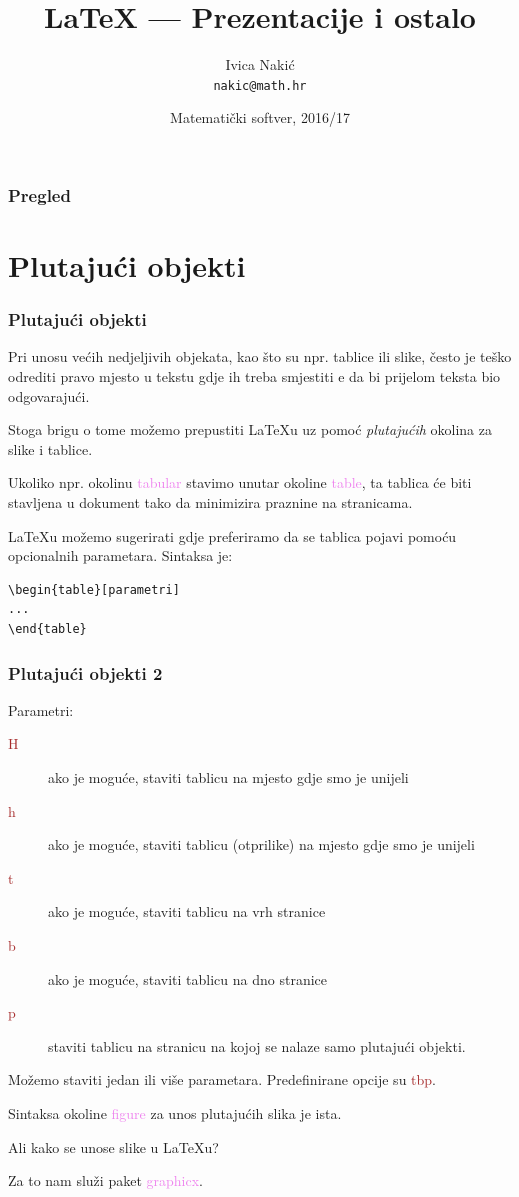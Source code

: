 \documentclass{beamer}
\title{\LaTeX{} --- Prezentacije i ostalo}
\subtitle{}
\author{Ivica Nakić \\ \texttt{nakic@math.hr}}
\institute[PMF--MO]{Matematički odsjek Prirodoslovno--matematičkog fakulteta}
\date[2016/17]{Matematički softver, 2016/17}
\theoremstyle{remark}
\theoremstyle{definition}
\begin{document}
\begin{frame}
  \maketitle  
\end{frame}

\begin{frame}
\frametitle{Pregled}
  \tableofcontents  
\end{frame}

\section{Plutajući objekti}

\begin{frame}[fragile]
\frametitle{Plutajući objekti}
Pri unosu većih nedjeljivih objekata, kao što su npr. tablice ili slike, često je teško odrediti pravo mjesto u tekstu gdje ih treba smjestiti e da bi prijelom teksta bio odgovarajući.

Stoga brigu o tome možemo prepustiti \LaTeX{}u uz pomoć \emph{plutajućih} okolina za slike i tablice. 

Ukoliko npr. okolinu \textcolor{violet}{tabular} stavimo unutar okoline \textcolor{violet}{table}, ta tablica će biti stavljena u dokument tako da minimizira praznine na stranicama.

\LaTeX{}u možemo sugerirati gdje preferiramo da se tablica pojavi pomoću opcionalnih parametara. Sintaksa je:
\begin{lstlisting}
\begin{table}[parametri]
...
\end{table}
\end{lstlisting}
\end{frame}

\begin{frame}
\frametitle{Plutajući objekti 2}
Parametri:
\begin{description}
\item[\textcolor{brown}{H}] ako je moguće, staviti tablicu na mjesto gdje smo je unijeli
\item[\textcolor{brown}{h}] ako je moguće, staviti tablicu (otprilike) na mjesto gdje smo je unijeli
\item[\textcolor{brown}{t}] ako je moguće, staviti tablicu na vrh stranice
\item[\textcolor{brown}{b}] ako je moguće, staviti tablicu na dno stranice
\item[\textcolor{brown}{p}] staviti tablicu na stranicu na kojoj se nalaze samo plutajući objekti.
\end{description}
Možemo staviti jedan ili više parametara. Predefinirane opcije su \textcolor{brown}{tbp}.

Sintaksa okoline \textcolor{violet}{figure} za unos plutajućih slika je ista. 

Ali kako se unose slike u \LaTeX u?

Za to nam služi paket \textcolor{violet}{graphicx}. 
\end{frame}
\end{document}
